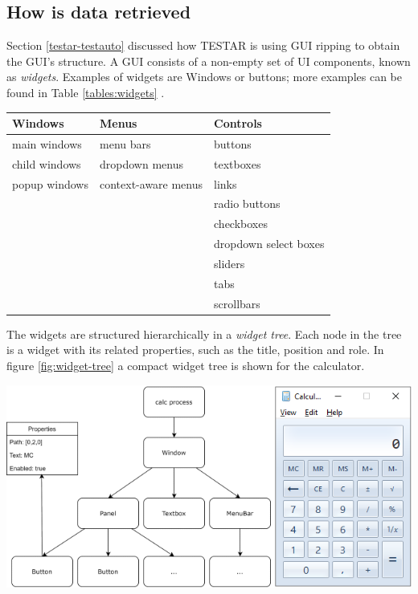 \subsection{How is data retrieved} \label{data-retrieval}

Section \ref{testar-testauto} discussed how TESTAR is using GUI ripping to obtain the GUI's structure. A GUI consists of a non-empty set of UI components, known as \emph{widgets}. Examples of widgets are Windows or buttons; more examples can be found in Table \ref{tables:widgets} \cite{VosAho2021}. 

\begingroup
\captionsetup{type=table}
\begin{tabularx}{\textwidth}{ 
  | >{\raggedright\arraybackslash}X 
  | >{\raggedright\arraybackslash}X 
  | >{\raggedright\arraybackslash}X | }
    \hline
    Windows & Menus & Controls \\
    \hline
    \hline
    main windows & menu bars & buttons \\
    child windows & dropdown menus & textboxes \\
    popup windows & context-aware menus & links \\
    && radio buttons \\
    && checkboxes\\
    && dropdown select boxes\\
    && sliders\\
    && tabs\\
    && scrollbars \\
    \hline
\end{tabularx}
\label{tables:widgets}
\endgroup

The widgets are structured hierarchically in a \emph{widget tree}. Each node in the tree is a widget with its related properties, such as the title, position and role. In figure \ref{fig:widget-tree} a compact widget tree is shown for the calculator. 

\bigskip
\begingroup
\captionsetup{type=figure}
\includegraphics{pics/calc-tree.png}
\label{fig:widget-tree}
\endgroup

